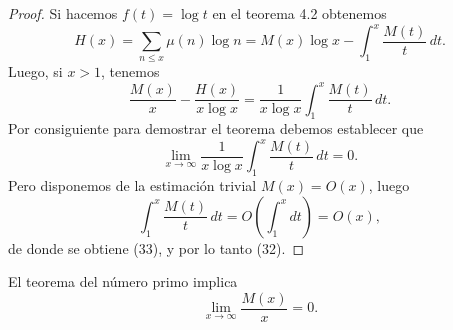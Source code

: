 \documentclass[12pt,a4paper]{book}
\begin{document}
    \begin{proof}
        Si hacemos $f(t)=\log t$ en el teorema 4.2 obtenemos
        \begin{equation*}
            H(x)=\sum_{n\leq x}\mu(n)\log n=M(x)\log x-\int_1^x\frac{M(t)}{t}\,dt.
        \end{equation*}
        Luego, si $x>1$, tenemos
        \begin{equation*}
            \frac{M(x)}{x}-\frac{H(x)}{x\log x}=\frac{1}{x\log x}\int_1^x\frac{M(t)}{t}\,dt.
        \end{equation*}
        Por consiguiente para demostrar el teorema debemos establecer que
        \begin{equation}
            \lim_{x\to\infty}\frac{1}{x\log x}\int_1^x\frac{M(t)}{t}\,dt=0.
        \end{equation}
        Pero disponemos de la estimación trivial $M(x)=O(x)$, luego
        \begin{equation*}
            \int_1^x\frac{M(t)}{t}\,dt=O\left(\int_1^x dt\right)=O(x),
        \end{equation*}
        de donde se obtiene (33), y por lo tanto (32).
    \end{proof}

    \begin{teorema}
        El teorema del número primo implica
        \begin{equation*}
            \lim_{x\to\infty}\frac{M(x)}{x}=0.
        \end{equation*}
    \end{teorema}
\end{document}
